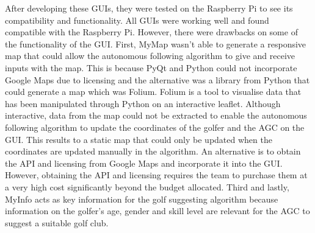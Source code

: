 \documentclass[11pt,landscape]{article}
\begin{document}
\begin{multicols}{3}
\begin{table}[H]
    \begin{center}
    \end{center}
    \label{tab:gui_descs}
\end{table}

After developing these GUIs, they were tested on the Raspberry Pi to see its
compatibility and functionality. All GUIs were working well and found compatible
with the Raspberry Pi. However, there were drawbacks on some of the
functionality of the GUI. First, MyMap wasn’t able to generate a responsive map
that could allow the autonomous following algorithm to give and receive inputs
with the map. This is because PyQt and Python could not incorporate Google Maps
due to licensing and the alternative was a library from Python that could
generate a map which was Folium. Folium is a tool to visualise data that has
been manipulated through Python on an interactive leaflet. Although interactive,
data from the map could not be extracted to enable the autonomous following
algorithm to update the coordinates of the golfer and the AGC on the GUI. This
results to a static map that could only be updated when the coordinates are
updated manually in the algorithm. An alternative is to obtain the API and licensing
from Google Maps and incorporate it into the GUI. However, obtaining the API and
licensing requires the team to purchase them at a very high cost significantly
beyond the budget allocated. Third and lastly, MyInfo acts as key information
for the golf suggesting algorithm because information on the golfer’s age,
gender and skill level are relevant for the AGC to suggest a suitable golf
club. 


\end{multicols}
\end{document}

